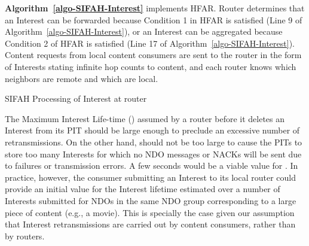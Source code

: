 \documentclass{ancs15-alternate}
\begin{document}
{\bf Algorithm~\ref{algo-SIFAH-Interest} } implements HFAR. Router  determines that an Interest can be forwarded because  Condition 1 in HFAR is satisfied (Line 9 of Algorithm~\ref{algo-SIFAH-Interest}), or an Interest can be aggregated because Condition 2 of HFAR is  satisfied (Line 17 of Algorithm~\ref{algo-SIFAH-Interest}). 
Content requests from local content consumers are sent to the router in the form of Interests stating infinite hop counts to content, and  each router knows which neighbors are remote  and which are local.

\begin{algorithm}[h]
\caption{SIFAH Processing of Interest at router }
\label{algo-SIFAH-Interest}
{\fontsize{8}{8}\selectfont
\begin{algorithmic}[1]


\IF{   }
	\IF{}
		\IF{}
		\ELSE 
			\IF{}
          		\ELSE
			\ENDIF
		\ENDIF
	\ELSE 
		\IF{  }
		\ELSE
		\ENDIF
	\ENDIF
\ENDIF
{}
\end{algorithmic}}
\end{algorithm}


The Maximum Interest Life-time () assumed by a router  before it deletes an Interest from its PIT 
should be  large enough to preclude an excessive number of retransmissions.
On the other hand,   should not be too large to cause the PITs to store too many Interests for which no NDO messages or NACKs will be sent due to failures or transmission errors. 
A few seconds would be a viable value for .
In practice, however, the consumer submitting an Interest to its local router could provide an initial value for the Interest lifetime estimated over a number of Interests submitted for NDOs in the same NDO group corresponding to a large piece of content (e.g., a movie).  This is specially the case given our assumption that Interest retransmissions are carried out by content consumers, rather than by routers.
\end{document}
